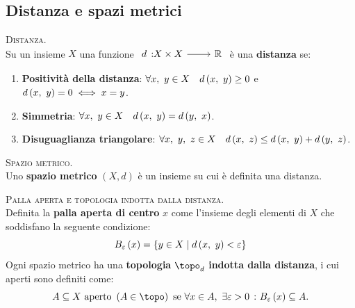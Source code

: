 \subsection{Distanza e spazi metrici}
\begin{define}\textsc{Distanza.}\\
	Su un insieme $X$ una funzione $\funz{d}{X\times X}{\realset}$ è una \textbf{distanza} se:
	\begin{enumerate}
		\item \textbf{Positività della distanza}: $\forall x,\ y\in X\quad d\left(x,\ y\right)\geq 0$ e $d\left(x,\ y\right)=0\iff x=y$.
		\item \textbf{Simmetria}: $\forall x,\ y\in X\quad d\left(x,\ y\right)=d\left(y,\ x\right)$.
		\item \textbf{Disuguaglianza triangolare}: $\forall x,\ y,\ z\in X\quad d\left(x,\ z\right)\leq d\left(x,\ y\right)+d\left(y,\ z\right)$.
	\end{enumerate}
\vspace{-3mm}
\end{define}
\begin{define}\textsc{Spazio metrico.}\\
	Uno \textbf{spazio metrico} $\left(X, d\right)$ è un insieme su cui è definita una distanza.
\end{define}
\begin{define}\textsc{Palla aperta e topologia indotta dalla distanza.}\\
	Definita la \textbf{palla aperta di centro} $x$ come l'insieme degli elementi di $X$ che soddisfano la seguente condizione:
	\begin{equation}
		B_{\varepsilon}\left(x\right)=\left\{y\in X\mid d\left(x,\ y\right)<\varepsilon\right\}
	\end{equation}
	Ogni spazio metrico ha una \textbf{topologia} $\topo_d$ \textbf{indotta dalla distanza}, i cui aperti sono definiti come:
	\begin{equation}
		A\subseteq X \text{ aperto } \left(A\in\topo\right) \text{ se } \forall x\in A,\ \exists \epsilon>0\ \colon B_{\epsilon}\left(x\right)\subseteq A.
	\end{equation}
\vspace{-6mm}
\end{define}
